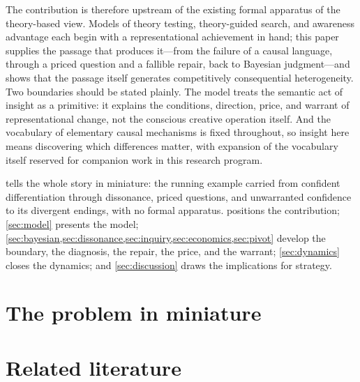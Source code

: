 \documentclass[11pt]{article}
\theoremstyle{definition}
\begin{document}
The contribution is therefore upstream of the existing formal apparatus of the theory-based view.
Models of theory testing, theory-guided search, and awareness advantage each begin with a representational achievement in hand; this paper supplies the passage that produces it---from the failure of a causal language, through a priced question and a fallible repair, back to Bayesian judgment---and shows that the passage itself generates competitively consequential heterogeneity.
Two boundaries should be stated plainly.
The model treats the semantic act of insight as a primitive: it explains the conditions, direction, price, and warrant of representational change, not the conscious creative operation itself.
And the vocabulary of elementary causal mechanisms is fixed throughout, so insight here means discovering which differences matter, with expansion of the vocabulary itself reserved for companion work in this research program.

 tells the whole story in miniature: the running example carried from confident differentiation through dissonance, priced questions, and unwarranted confidence to its divergent endings, with no formal apparatus.
 positions the contribution; \cref{sec:model} presents the model; \cref{sec:bayesian,sec:dissonance,sec:inquiry,sec:economics,sec:pivot} develop the boundary, the diagnosis, the repair, the price, and the warrant; \cref{sec:dynamics} closes the dynamics; and \cref{sec:discussion} draws the implications for strategy.

\section{The problem in miniature}
\label{sec:miniature}

\section{Related literature}
\label{sec:literature}
\end{document}
